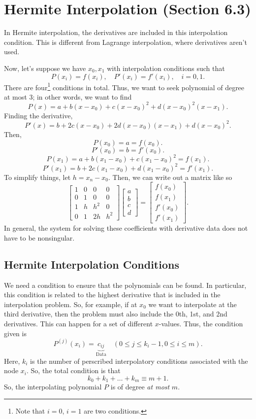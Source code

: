 \documentclass[letterpaper]{article}
\begin{document}
\section{Hermite Interpolation (Section 6.3)}
In Hermite interpolation, the derivatives are included in this interpolation condition. This is different from Lagrange interpolation, where derivatives aren't used. 

\bigskip 

Now, let's suppose we have $x_0, x_1$ with interpolation conditions such that \[P(x_i) = f(x_i), \quad P'(x_i) = f'(x_i), \quad i = 0, 1.\]
There are four\footnote{Note that $i = 0$, $i = 1$ are two conditions.} conditions in total. Thus, we want to seek polynomial of degree at most 3; in other words, we want to find 
\[P(x) = a + b(x - x_0) + c(x - x_0)^2 + d(x - x_0)^2 (x - x_1).\]
Finding the derivative, 
\[P'(x) = b + 2c(x - x_0) + 2d(x - x_0)(x - x_1) + d(x - x_0)^2.\]
Then, 
\[P(x_0) = a = f(x_0).\]
\[P'(x_0) = b = f'(x_0).\]
\[P(x_1) = a + b(x_1 - x_0) + c(x_1 - x_0)^2 = f(x_1).\]
\[P'(x_1) = b + 2c(x_1 - x_0) + d(x_1 - x_0)^2 = f'(x_1).\]
To simplify things, let $h = x_n - x_0$. Then, we can write out a matrix like so 
\[\begin{bmatrix}
    1 & 0 & 0 & 0 \\ 
    0 & 1 & 0 & 0 \\ 
    1 & h & h^2 & 0 \\ 
    0 & 1 & 2h & h^2
\end{bmatrix} \begin{bmatrix}
    a \\ 
    b \\ 
    c \\ 
    d 
\end{bmatrix} = \begin{bmatrix}
    f(x_0) \\ 
    f(x_1) \\ 
    f'(x_0) \\ 
    f'(x_1)
\end{bmatrix}.\]
In general, the system for solving these coefficients with derivative data does not have to be nonsingular. 

\subsection{Hermite Interpolation Conditions}
We need a condition to ensure that the polynomials can be found. In particular, this condition is related to the highest derivative that is included in the interpolation problem. So, for example, if at $x_0$ we want to interpolate at the third derivative, then the problem must also include the 0th, 1st, and 2nd derivatives. This can happen for a set of different $x$-values. Thus, the condition given is 
\[P^{(j)}(x_i) = \underbrace{c_{ij}}_{\text{Data}} \quad (0 \leq j \leq k_i - 1, 0 \leq i \leq m).\] 
Here, $k_i$ is the number of perscribed interpolatory conditions associated with the node $x_i$. 
So, the total condition is that 
\[k_0 + k_1 + \hdots + k_m \equiv m + 1.\]
So, the interpolating polynomial $P$ is of degree \emph{at most} $m$.
\end{document}
